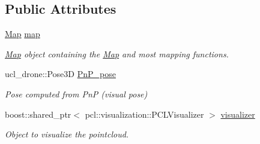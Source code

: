 \subsection*{Public Attributes}
\begin{DoxyCompactItemize}
\item 
\mbox{\label{classMappingNode_ae28a4c1af11db9e6eb56ffe52efd5877}} 
\hyperlink{classMap}{Map} \hyperlink{classMappingNode_ae28a4c1af11db9e6eb56ffe52efd5877}{map}
\begin{DoxyCompactList}\small\item\em \hyperlink{classMap}{Map} object containing the \hyperlink{classMap}{Map} and most mapping functions. \end{DoxyCompactList}\item 
\mbox{\label{classMappingNode_a17b9d538c600192cabffacb62fba76b5}} 
ucl\+\_\+drone\+::\+Pose3D \hyperlink{classMappingNode_a17b9d538c600192cabffacb62fba76b5}{Pn\+P\+\_\+pose}
\begin{DoxyCompactList}\small\item\em Pose computed from PnP (visual pose) \end{DoxyCompactList}\item 
\mbox{\label{classMappingNode_a8c15195ff027224d02c9c541bbe4ffb8}} 
boost\+::shared\+\_\+ptr$<$ pcl\+::visualization\+::\+P\+C\+L\+Visualizer $>$ \hyperlink{classMappingNode_a8c15195ff027224d02c9c541bbe4ffb8}{visualizer}
\begin{DoxyCompactList}\small\item\em Object to visualize the pointcloud. \end{DoxyCompactList}\end{DoxyCompactItemize}
